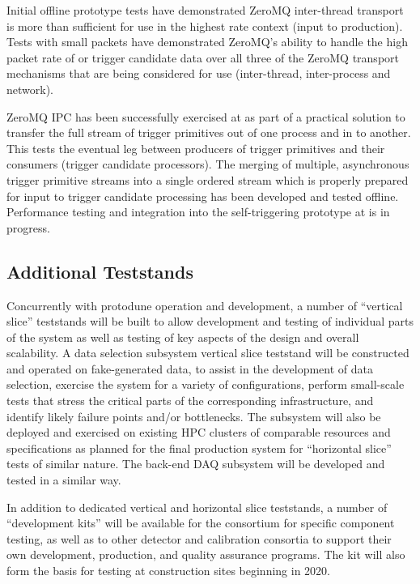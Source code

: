 Initial offline prototype tests have demonstrated ZeroMQ inter-thread transport
is more than sufficient for use in the highest rate  context (input
to  production).
Tests with small packets have demonstrated ZeroMQ's ability to handle the high
packet rate of  or trigger candidate data over all three of
the ZeroMQ transport mechanisms that are being considered for use (inter-thread,
inter-process and network).  

ZeroMQ IPC has been successfully exercised at  as part of a
practical solution to transfer the full stream of trigger primitives out of one
process and in to another. 
This tests the eventual leg between producers of trigger primitives and their
consumers (trigger candidate processors). 
The merging of multiple, asynchronous trigger primitive streams into a single
ordered stream which is properly prepared for input to trigger candidate
processing has been developed and tested offline. 
Performance testing and integration into the self-triggering prototype at
 is in progress.


\subsection{Additional Teststands}
\label{sec:daq:validation-demonstrators}

Concurrently with protodune operation and development, a number of
``vertical slice'' teststands will be built to allow 
development and testing of individual parts of the  system
as well as testing of key aspects of the design and overall
scalability. A data selection subsystem vertical slice teststand will be
constructed and operated on fake-generated data, to assist in the
development of data selection, exercise the system for a variety of
configurations, perform small-scale tests that stress the critical
parts of the corresponding infrastructure, 
and identify likely failure points and/or bottlenecks. The subsystem
will also be deployed and exercised on existing HPC clusters of
comparable resources and specifications as planned for the final
production system for ``horizontal slice'' tests of similar nature. The
back-end DAQ subsystem will be developed and tested in a similar way.

In addition to dedicated vertical and horizontal slice teststands, a number of
 ``development kits'' will be available for the consortium for
specific component testing, as well as to other detector and
calibration consortia to support their own development, production, and quality assurance programs. The  
kit will also form the basis for testing at construction sites beginning in 2020. 

